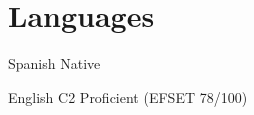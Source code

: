 
\section{Languages}

\langitem
    {Spanish}
    {Native}

\langitem
    {English}
    {C2 Proficient (EFSET 78/100)}

